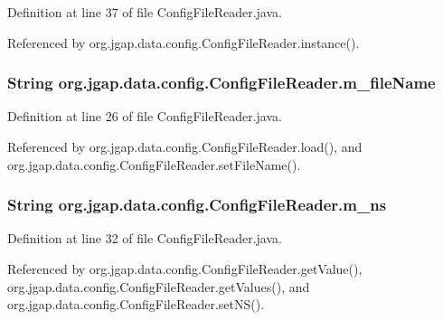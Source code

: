 Definition at line 37 of file Config\-File\-Reader.\-java.



Referenced by org.\-jgap.\-data.\-config.\-Config\-File\-Reader.\-instance().

\hypertarget{classorg_1_1jgap_1_1data_1_1config_1_1_config_file_reader_a7e2e6cff08e2d75660108785ed3273c9}{
\subsubsection[{m\-\_\-file\-Name}]{\setlength{\rightskip}{0pt plus 5cm}String org.\-jgap.\-data.\-config.\-Config\-File\-Reader.\-m\-\_\-file\-Name\hspace{0.3cm}{\ttfamily [private]}}}\label{classorg_1_1jgap_1_1data_1_1config_1_1_config_file_reader_a7e2e6cff08e2d75660108785ed3273c9}


Definition at line 26 of file Config\-File\-Reader.\-java.



Referenced by org.\-jgap.\-data.\-config.\-Config\-File\-Reader.\-load(), and org.\-jgap.\-data.\-config.\-Config\-File\-Reader.\-set\-File\-Name().

\hypertarget{classorg_1_1jgap_1_1data_1_1config_1_1_config_file_reader_a2dcdea1bf656cc0d26988910118d5a0c}{
\subsubsection[{m\-\_\-ns}]{\setlength{\rightskip}{0pt plus 5cm}String org.\-jgap.\-data.\-config.\-Config\-File\-Reader.\-m\-\_\-ns\hspace{0.3cm}{\ttfamily [private]}}}\label{classorg_1_1jgap_1_1data_1_1config_1_1_config_file_reader_a2dcdea1bf656cc0d26988910118d5a0c}


Definition at line 32 of file Config\-File\-Reader.\-java.



Referenced by org.\-jgap.\-data.\-config.\-Config\-File\-Reader.\-get\-Value(), org.\-jgap.\-data.\-config.\-Config\-File\-Reader.\-get\-Values(), and org.\-jgap.\-data.\-config.\-Config\-File\-Reader.\-set\-N\-S().

